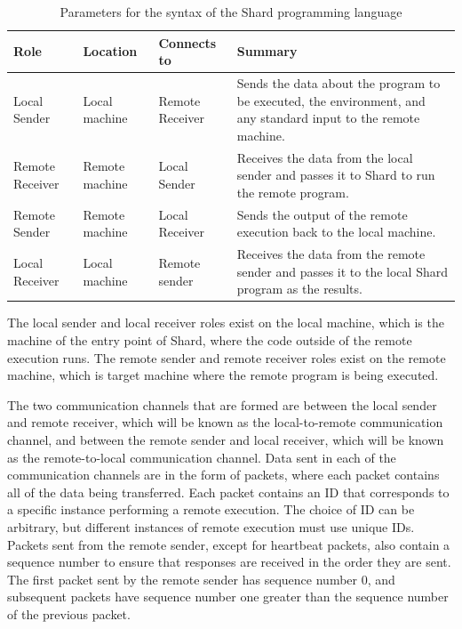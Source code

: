 \documentclass[twoside]{report}
\begin{document}
\begin{table}
  \begin{center}
    \begin{tabularx}{\textwidth}{|l|l|l|X|}
      \hline
      Role            & Location       & Connects to     & Summary                                                                                                         \\ \hline
      Local Sender    & Local machine  & Remote Receiver & Sends the data about the program to be executed, the environment, and any standard input to the remote machine.
      \\ \hline
      Remote Receiver & Remote machine & Local Sender    & Receives the data from the local sender and passes it to Shard to run the remote program.
      \\ \hline
      Remote Sender   & Remote machine & Local Receiver  & Sends the output of the remote execution back to the local machine.
      \\ \hline
      Local Receiver  & Local machine  & Remote sender   & Receives the data from the remote sender and passes it to the local Shard program as the results.
      \\ \hline
    \end{tabularx}
    \caption{Parameters for the syntax of the Shard programming language}
    \label{fig:roles_design}
  \end{center}
\end{table}

The local sender and local receiver roles exist on the local machine, which is the machine of the entry point of Shard, where the code outside of the remote execution runs.
The remote sender and remote receiver roles exist on the remote machine, which is target machine where the remote program is being executed.

The two communication channels that are formed are between the local sender and remote receiver, which will be known as the local-to-remote communication channel, and between the remote sender and local receiver, which will be known as the remote-to-local communication channel.
Data sent in each of the communication channels are in the form of packets, where each packet contains all of the data being transferred.
Each packet contains an ID that corresponds to a specific instance performing a remote execution.
The choice of ID can be arbitrary, but different instances of remote execution must use unique IDs.
Packets sent from the remote sender, except for heartbeat packets, also contain a sequence number to ensure that responses are received in the order they are sent.
The first packet sent by the remote sender has sequence number 0, and subsequent packets have sequence number one greater than the sequence number of the previous packet.
\end{document}
